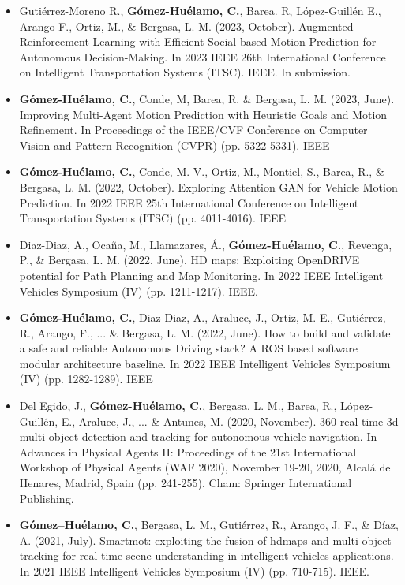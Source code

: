 \begin{refsection}
\begin{itemize}
\item Gutiérrez-Moreno R., \textbf{Gómez-Huélamo, C.}, Barea. R, López-Guillén E., Arango F., Ortiz, M., \& Bergasa, L. M. (2023, October). Augmented Reinforcement Learning with Efficient Social-based Motion Prediction for Autonomous Decision-Making. In 2023 IEEE 26th International Conference on Intelligent Transportation Systems (ITSC). IEEE. In submission.

\item \textbf{Gómez-Huélamo, C.}, Conde, M, Barea, R. \& Bergasa, L. M. (2023, June). Improving Multi-Agent Motion Prediction with Heuristic Goals and Motion Refinement. In Proceedings of the IEEE/CVF Conference on Computer Vision and Pattern Recognition (CVPR) (pp. 5322-5331). IEEE

\item \textbf{Gómez-Huélamo, C.}, Conde, M. V., Ortiz, M., Montiel, S., Barea, R., \& Bergasa, L. M. (2022, October). Exploring Attention GAN for Vehicle Motion Prediction. In 2022 IEEE 25th International Conference on Intelligent Transportation Systems (ITSC) (pp. 4011-4016). IEEE

\item Diaz-Diaz, A., Ocaña, M., Llamazares, Á., \textbf{Gómez-Huélamo, C.}, Revenga, P., \& Bergasa, L. M. (2022, June). HD maps: Exploiting OpenDRIVE potential for Path Planning and Map Monitoring. In 2022 IEEE Intelligent Vehicles Symposium (IV) (pp. 1211-1217). IEEE.

\item \textbf{Gómez-Huélamo, C.}, Diaz-Diaz, A., Araluce, J., Ortiz, M. E., Gutiérrez, R., Arango, F., ... \& Bergasa, L. M. (2022, June). How to build and validate a safe and reliable Autonomous Driving stack? A ROS based software modular architecture baseline. In 2022 IEEE Intelligent Vehicles Symposium (IV) (pp. 1282-1289). IEEE

\item Del Egido, J., \textbf{Gómez-Huélamo, C.}, Bergasa, L. M., Barea, R., López-Guillén, E., Araluce, J., ... \& Antunes, M. (2020, November). 360 real-time 3d multi-object detection and tracking for autonomous vehicle navigation. In Advances in Physical Agents II: Proceedings of the 21st International Workshop of Physical Agents (WAF 2020), November 19-20, 2020, Alcalá de Henares, Madrid, Spain (pp. 241-255). Cham: Springer International Publishing.

\item \textbf{Gómez–Huélamo, C.}, Bergasa, L. M., Gutiérrez, R., Arango, J. F., \& Díaz, A. (2021, July). Smartmot: exploiting the fusion of hdmaps and multi-object tracking for real-time scene understanding in intelligent vehicles applications. In 2021 IEEE Intelligent Vehicles Symposium (IV) (pp. 710-715). IEEE.


\end{itemize}
\end{refsection}
